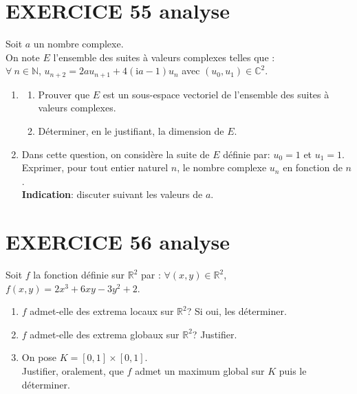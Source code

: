 \documentclass[10pt,oneside]{article}
\begin{document}
\begin{flushleft}
\begin{enumerate}
\begin{enumerate}
\end{enumerate}
\end{enumerate} 


\section*{EXERCICE 55 \:analyse }


Soit $a$ un nombre complexe.\\
On note $E$ l'ensemble des suites à valeurs complexes telles que :\\ $\forall\:n\in\mathbb{N}$, $u_{n+2}=2au_{n+1}+4(\mathrm{i}a-1)u_n$ avec $(u_0,u_1)\in  \mathbb{C} ^2$.
\begin{enumerate}
\item
\begin{enumerate}

\item 
Prouver que $E$ est un sous-espace vectoriel de l'ensemble des suites à valeurs complexes.
\item

Déterminer, en le justifiant, la dimension de $E$. 
\end{enumerate}
\item
Dans cette question, on considère la suite de $E$ définie par:
$u_0=1$ et $u_1=1$. \\
 Exprimer, pour tout entier naturel $n$, le nombre complexe  $u_n$ en fonction de $n$.\\
\medskip
\textbf{ Indication}: discuter suivant les valeurs de $a$. 
\end{enumerate}

\section*{EXERCICE 56 \:analyse }


  Soit $f$ la fonction définie sur $\mathbb{R}^2$ par : $\forall(x,y)\in\mathbb{R}^2$, $f(x,y)=2x^3+6xy-3y^2+2$.
  \begin{enumerate}
  \item
  $f$ admet-elle des extrema locaux sur $\mathbb{R}^2$?
  Si oui, les déterminer.
  \item
  $f$ admet-elle des extrema globaux sur $\mathbb{R}^2$? Justifier.
  \item
  On pose $K=\left[ 0,1\right]\times \left[0,1 \right]$. \\
  Justifier, oralement,  que $f$ admet un maximum global sur $K$ puis  le déterminer.
  \end{enumerate}
 



\end{flushleft}
\end{document}
